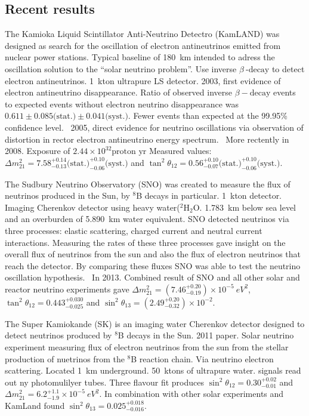 


\subsection{Recent results}

The Kamioka Liquid Scintillator Anti-Neutrino Detectro (KamLAND) was 
designed as search for the oscillation of electron antineutrinos
emitted from nuclear power stations. 
Typical baseline of 180~km intended to adress the oscillation
solution to the ``solar neutrino problem''.
Use inverse $\beta~\text{-decay}$ to detect electron
antineutrinos. 1~kton ultrapure LS detector.
2003, first evidence of electron antineutrino disappearance. Ratio of 
observed inverse $\beta-\text{decay}$ events to expected events
without electron neutrino disappearance
was $0.611 \pm 0.085\text{(stat.)} \pm
0.041\text{(syst.)}$. Fewer events than expected at the 99.95\%
confidence level.~\cite{Kamland:PhysRevLett.90.021802}  
2005, direct evidence for neutrino oscillations via observation of 
distortion in rector electron antineutrino energy
spectrum.~\cite{Kamland:PhysRevLett.94.081801} 
More rectently in 2008. 
Exposure of $2.44 \times 10^{32} \text{proton yr}$
Measured values: 
$\Delta m^2_{21} =
7.58^{+0.14}_{-0.13}\text{(stat.)}^{+0.10}_{-0.06}\text{(syst.)}$  and
$\tan^2\theta_{12} =
0.56^{+0.10}_{-0.07}\text{(stat.)}^{+0.10}_{-0.06}
\text{(syst.)}$.~\cite{Kamland:PhysRevLett.100.221803}  

The Sudbury Neutrino Observatory (SNO) was created to measure the flux
of neutrinos produced in the Sun, by $^8$B decays in particular.
1~kton detector. Imaging Cherenkov detector using
heavy water($^2\text{H}_2\text{O}$. 1.783~km below sea level and an 
overburden of 5.890~km water equivalent. SNO detected neutrinos via 
three processes: elastic scattering, charged current and neutral
current interactions. Measuring the rates of these three processes
gave insight on the overall flux of neutrinos from the sun and also
the flux of electron neutrinos that reach the
detector. By comparing these fluxes SNO was able to test the neutrino
oscillation hypothesis.~\cite{SNO:PhysRevC.81.055504}   
In 2013. Combined result of SNO and all other solar and reactor
neutrino experiments gave
$\Delta m^2_{21} = (7.46^{+0.20}_{-0.19}) \times 10^{-5}~eV^2$, 
$\tan^2\theta_{12} = 0.443^{+0.030}_{-0.025}$ and 
$\sin^2\theta_{13} = (2.49^{+0.20}_{-0.32}) \times
10^{-2}$.~\cite{SNO:PhysRevC.88.025501}  


The Super Kamiokande (SK) is an imaging water Cherenkov detector
designed to detect neutrinos produced by $^8$B decays in the Sun.
2011 paper. Solar neutrino experiment measuring flux of electron
neutrinos from the sun from the stellar production of nuetrinos from
the $^8$B reaction chain. Via neutrino electron scattering. Located
1~km underground. 50~ktons of ultrapure water. signals read out ny
photomulilyer tubes.
Three flavour fit produces
$\sin^2\theta_{12} = 0.30 ^{+0.02}_{-0.01}$ and $\Delta m^2_{21} = 6.2
^{+1.1}_{-1.9} \times 10^{-5}~eV^2$.  In combination with other solar
experiments and KamLand found $\sin^2\theta_{13} =
0.025^{+0.018}_{-0.016}$.~\cite{SK:PhysRevD.73.112001}~\cite{SK:PhysRevD.83.052010} 


